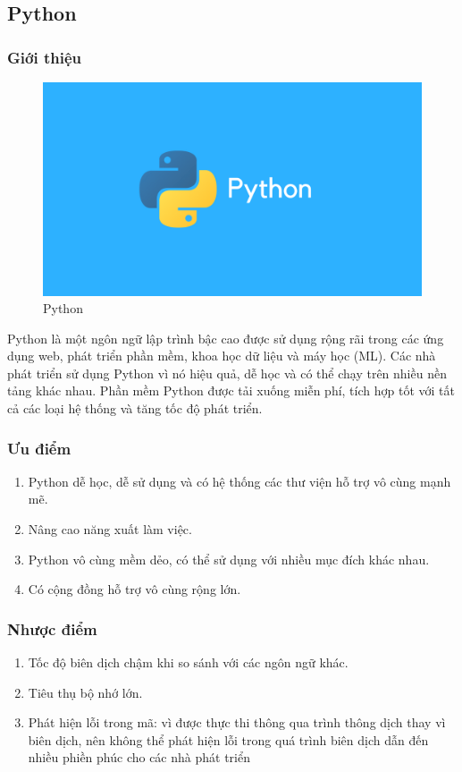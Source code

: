 \subsection{Python}
    \subsubsection{Giới thiệu}
        \begin{figure}[h]
            \centering
            \includegraphics[width=0.99\linewidth]{images/appropriate framework/python.png}
            \caption{Python}
        \end{figure}
        Python là một ngôn ngữ lập trình bậc cao được sử dụng rộng rãi trong các ứng dụng web, phát triển phần mềm, khoa học dữ liệu và máy học (ML). Các nhà phát triển sử dụng Python vì nó hiệu quả, dễ học và có thể chạy trên nhiều nền tảng khác nhau. Phần mềm Python được tải xuống miễn phí, tích hợp tốt với tất cả các loại hệ thống và tăng tốc độ phát triển.
    \subsubsection{Ưu điểm}
        \begin{enumerate}
            \item Python dễ học, dễ sử dụng và có hệ thống các thư viện hỗ trợ vô cùng mạnh mẽ.
            \item Nâng cao năng xuất làm việc.
            \item Python vô cùng mềm dẻo, có thể sử dụng với nhiều mục đích khác nhau.
            \item Có cộng đồng hỗ trợ vô cùng rộng lớn.
        \end{enumerate}
    \subsubsection{Nhược điểm}
        \begin{enumerate}
            \item Tốc độ biên dịch chậm khi so sánh với các ngôn ngữ khác.
            \item Tiêu thụ bộ nhớ lớn.
            \item Phát hiện lỗi trong mã: vì được thực thi thông qua trình thông dịch thay vì biên dịch, nên không thể phát hiện lỗi trong quá trình biên dịch dẫn đến nhiều phiền phúc cho các nhà phát triển
        \end{enumerate}
\newpage